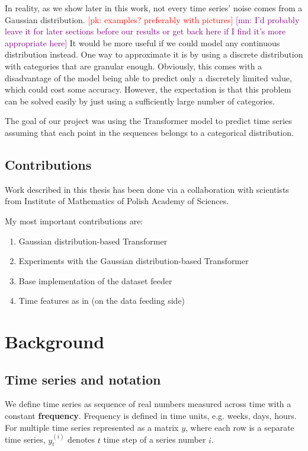 \documentclass[en]{pracamgr}
\newcommand{\pk}[1]{\textcolor{red}{\small [pk: #1]}}
\newcommand{\mn}[1]{\textcolor{purple}{\small [mn: #1]}}
\begin{document}
In reality, as we show later in this work, not every time series' noise comes from a Gaussian distribution. \pk{examples? preferably with pictures} \mn{I'd probably leave it for later sections before our results or get back here if I find it's more appropriate here}
It would be more useful if we could model any continuous distribution instead. One way to approximate it is by using a discrete distribution with categories that are granular enough. Obviously, this comes with a disadvantage of the model being able to predict only a discretely limited value, which could cost some accuracy. However, the expectation is that this problem can be solved easily by just using a sufficiently large number of categories.

The goal of our project was using the Transformer model to predict time series assuming that each point in the sequences belongs to a categorical distribution.



\section{Contributions}\label{r:contributions}

Work described in this thesis has been done via a collaboration with scientists from Institute of Mathematics of Polish Academy of Sciences.

My most important contributions are:
\begin{enumerate}
	\item Gaussian distribution-based Transformer
	\item Experiments with the Gaussian distribution-based Transformer
	\item Base implementation of the dataset feeder
	\item Time features as in \cite{enhancing} (on the data feeding side)
\end{enumerate}

\chapter{Background}\label{r:background}

\section{Time series and notation}

We define time series as sequence of real numbers measured across time with a constant \textbf{frequency}. Frequency is defined in time units, e.g. weeks, days, hours. For multiple time series represented as a matrix $y$, where each row is a separate time series, $y^{(i)}_t$ denotes $t$ time step of a series number $i$.
\end{document}

